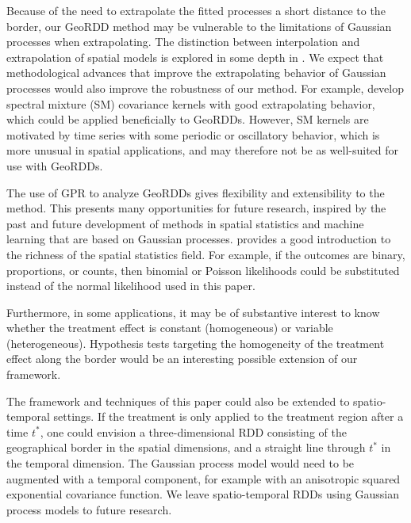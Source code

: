 Because of the need to extrapolate the fitted processes a short distance to the border, our GeoRDD method may be vulnerable to the limitations of Gaussian processes when extrapolating.
The distinction between interpolation and extrapolation of spatial models is explored in some depth in \citet{stein2012interpolation}.
We expect that methodological advances that improve the extrapolating behavior of Gaussian processes would also improve the robustness of our method.
For example, \citet{wilson2013gaussian} develop spectral mixture (SM) covariance kernels with good extrapolating behavior, which could be applied beneficially to GeoRDDs.
However, SM kernels are motivated by time series with some periodic or oscillatory behavior, which is more unusual in spatial applications, and may therefore not be as well-suited for use with GeoRDDs.

The use of GPR to analyze GeoRDDs gives flexibility and extensibility to the method.
This presents many opportunities for future research, inspired by the past and future development of methods in spatial statistics and machine learning that are based on Gaussian processes.
\citet{banerjee2014hierarchical} provides a good introduction to the richness of the spatial statistics field.
For example, if the outcomes are binary, proportions, or counts, then binomial or Poisson likelihoods could be substituted instead of the normal likelihood used in this paper.

Furthermore, in some applications, it may be of substantive interest to know whether the treatment effect is constant (homogeneous) or variable (heterogeneous).
Hypothesis tests targeting the homogeneity of the treatment effect along the border would be an interesting possible extension of our framework.

The framework and techniques of this paper could also be extended to spatio-temporal settings.
If the treatment is only applied to the treatment region after a time \(t^*\), one could envision a three-dimensional RDD consisting of the geographical border in the spatial dimensions, and a straight line through \(t^*\) in the temporal dimension.
The Gaussian process model would need to be augmented with a temporal component, for example with an anisotropic squared exponential covariance function.
We leave spatio-temporal RDDs using Gaussian process models to future research.
